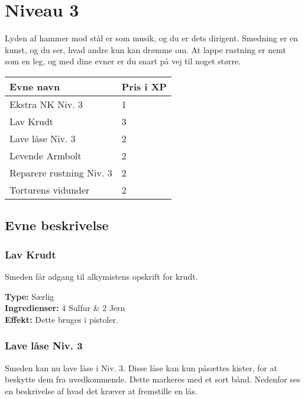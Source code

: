 \chapter*{Niveau 3}
Lyden af hammer mod stål er som musik, og du er dets dirigent. Smedning er en kunst, og du ser, hvad andre kun kan drømme om. At lappe rustning er nemt som en leg, og med dine evner er du snart på vej til noget større.

\begin{table}[H]
    \centering
    \begin{tabular}{|p{}|p{}|}
    \rowcolor{cerulean!80}\hline
        Evne navn & Pris i XP \\\hline
        Ekstra NK Niv. 3 & 1 \\\hline
        Lav Krudt & 3 \\\hline
        Lave låse Niv. 3 & 2 \\\hline
        Levende Armbolt & 2 \\\hline
        Reparere rustning Niv. 3 & 2\\\hline
        Torturens vidunder & 2 \\\hline
    \end{tabular}
\end{table}
\section*{Evne beskrivelse}



\subsection*{Lav Krudt}
Smeden får adgang til alkymistens opskrift for krudt.
\begin{særlig*}[Krudt]
\textbf{Type:} Særlig\\
\textbf{Ingredienser:} 4 Sulfur \& 2 Jern\\
\textbf{Effekt:} Dette bruges i pistoler.\\
\end{særlig*}

\subsection*{Lave låse Niv. 3}
Smeden kan nu lave låse i Niv. 3. Disse låse kan kun påsættes kister, for at beskytte dem fra uvedkommende. Dette markeres med et sort bånd. Nedenfor ses en beskrivelse af hvad det kræver at fremstille en lås.\\

